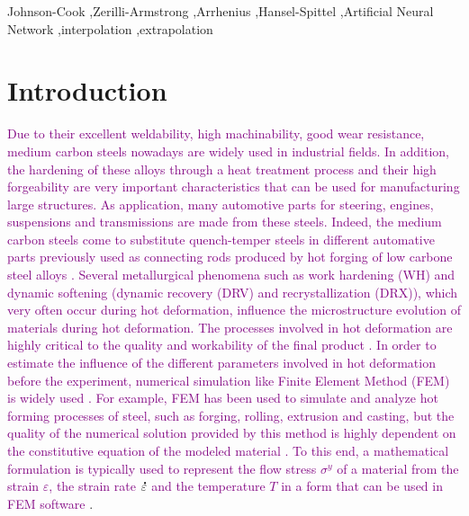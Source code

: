 \documentclass[twoside,english,1p,final,sort&compress]{elsarticle}
\theoremstyle{plain}
\DeclareRobustCommand{\mdot}[1]{\accentset{\mbox{\bfseries .}}{#1}}
\begin{document}
\begin{frontmatter}
\begin{keyword}
Johnson-Cook \sep Zerilli-Armstrong \sep Arrhenius \sep Hansel-Spittel \sep Artificial Neural Network  \sep interpolation  \sep extrapolation 
\end{keyword}

\end{frontmatter}
\linenumbers

\section{Introduction\label{sec:Introduction}}
\textcolor{purple}{Due to their excellent weldability, high machinability, good wear resistance, medium carbon steels nowadays are widely used in industrial fields. In addition, the hardening of these alloys through a heat treatment process and their high forgeability are very important characteristics that can be used for manufacturing large structures. As application, many automotive parts for steering, engines, suspensions and transmissions are made from these steels. Indeed, the medium carbon steels come to substitute quench-temper steels in different automative parts previously used as connecting rods produced by hot forging of low carbone steel alloys \cite{murugesan2019two, murugesan2019hybrid, tavakoli2019ferrite, ebrahimi2017flow}. Several metallurgical phenomena such as work hardening (WH) and dynamic softening (dynamic recovery (DRV) and recrystallization (DRX)), which very often occur during hot deformation, influence the microstructure evolution of materials during hot deformation. The processes involved in hot deformation are highly critical to the quality and workability of the final product \cite{Ashtiani-2012}. In order to estimate the influence of the different parameters involved in hot deformation before the experiment, numerical simulation like Finite Element Method (FEM) is widely used \cite{He-2013, Changizian-2012}. For example, FEM has been used to simulate and analyze hot forming processes of steel, such as forging, rolling, extrusion and casting, but the quality of the numerical solution provided by this method is highly dependent on the constitutive equation of the modeled material \cite{Mandal-2009, Qin-2010, Ji-2018}. To this end, a mathematical formulation is typically used to represent the flow stress $\sigma^y$ of a material from the strain $\varepsilon$, the strain rate $\mdot\varepsilon$ and the temperature $T$ in a form that can be used in FEM software \cite{Lin-2008-P, Wu-2012}}. 
\end{document}
